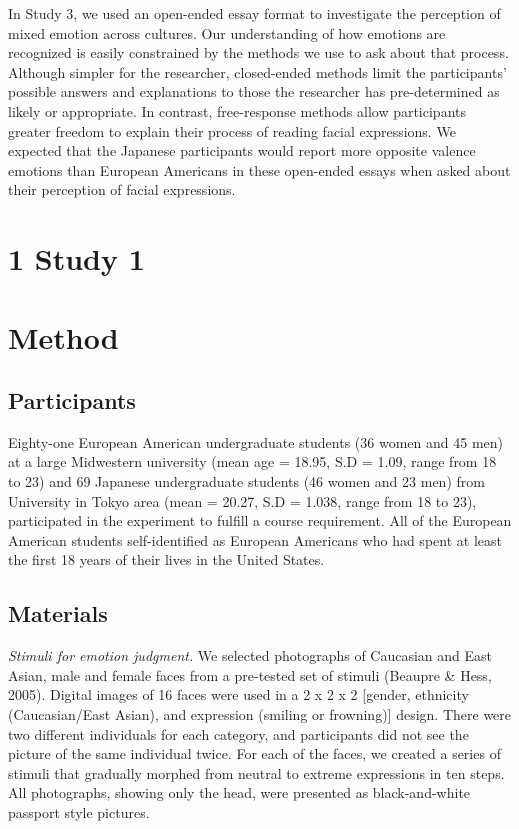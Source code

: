 \documentclass[english,man]{apa6}
\begin{document}
In Study 3, we used an open-ended essay format to investigate the
perception of mixed emotion across cultures. Our understanding of how
emotions are recognized is easily constrained by the methods we use to
ask about that process. Although simpler for the researcher,
closed-ended methods limit the participants' possible answers and
explanations to those the researcher has pre-determined as likely or
appropriate. In contrast, free-response methods allow participants
greater freedom to explain their process of reading facial expressions.
We expected that the Japanese participants would report more opposite
valence emotions than European Americans in these open-ended essays when
asked about their perception of facial expressions.

\section{1 Study 1}\label{study-1}

\section{Method}\label{method}

\subsection{Participants}\label{participants}

Eighty-one European American undergraduate students (36 women and 45
men) at a large Midwestern university (mean age = 18.95, S.D = 1.09,
range from 18 to 23) and 69 Japanese undergraduate students (46 women
and 23 men) from University in Tokyo area (mean = 20.27, S.D = 1.038,
range from 18 to 23), participated in the experiment to fulfill a course
requirement. All of the European American students self-identified as
European Americans who had spent at least the first 18 years of their
lives in the United States.

\subsection{Materials}\label{materials}

\emph{Stimuli for emotion judgment.} We selected photographs of
Caucasian and East Asian, male and female faces from a pre-tested set of
stimuli (Beaupre \& Hess, 2005). Digital images of 16 faces were used in
a 2 x 2 x 2 {[}gender, ethnicity (Caucasian/East Asian), and expression
(smiling or frowning){]} design. There were two different individuals
for each category, and participants did not see the picture of the same
individual twice. For each of the faces, we created a series of stimuli
that gradually morphed from neutral to extreme expressions in ten steps.
All photographs, showing only the head, were presented as
black-and-white passport style pictures.
\end{document}
